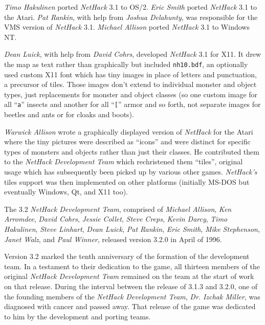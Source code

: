 \documentclass[titlepage]{article}
\begin{document}
\medskip
\noindent \textit{Timo Hakulinen} ported \textit{NetHack} 3.1 to OS/2.
\textit{Eric Smith} ported \textit{NetHack} 3.1 to the Atari.
\textit{Pat Rankin}, with help from \textit{Joshua Delahunty},
was responsible for the VMS version of \textit{NetHack} 3.1.
\textit{Michael Allison} ported \textit{NetHack} 3.1 to Windows NT.

\medskip
\noindent \textit{Dean Luick}, with help from \textit{David Cohrs}, developed
\textit{NetHack} 3.1 for X11.
It drew the map as text rather than graphically but
included \texttt{nh10.bdf}, an optionally used custom X11 font which has
tiny images in place of letters and punctuation, a precursor of tiles.
Those images don't extend to individual monster and object types, just
replacements for monster and object classes (so one custom image for all
``\texttt{a}'' insects and another for all ``\texttt{[}'' armor and so
forth, not separate images for beetles and ants or for cloaks and boots).

\medskip
\noindent \textit{Warwick Allison} wrote a graphically displayed version
of \textit{NetHack}
for the Atari where the tiny pictures were described as ``icons'' and
were distinct for specific types of monsters and objects rather than just
their classes.
He contributed them to the \textit{NetHack Development Team} which
rechristened them ``tiles'', original usage which has subsequently been
picked up by various other games.
\textit{NetHack's} tiles support was then implemented on other platforms
(initially MS-DOS but eventually Windows, Qt, and X11 too).

\medskip
\noindent The 3.2 \textit{NetHack Development Team}, comprised of \textit{Michael Allison}, \textit{Ken
Arromdee}, \textit{David Cohrs}, \textit{Jessie Collet}, \textit{Steve Creps}, {\it
Kevin Darcy}, \textit{Timo Hakulinen}, \textit{Steve Linhart}, \textit{Dean Luick},
\textit{Pat Rankin}, \textit{Eric Smith}, \textit{Mike Stephenson}, \textit{Janet Walz},
and \textit{Paul Winner}, released version 3.2.0 in April of 1996.

\medskip
\noindent Version 3.2 marked the tenth anniversary of the formation of the
development team.
In a testament to their dedication to the game, all thirteen members
of the original \textit{NetHack Development Team} remained on the team at the
start of work on that release.
During the interval between the release of 3.1.3 and 3.2.0,
one of the founding members of the \textit{NetHack Development Team},
\textit{Dr. Izchak Miller}, was diagnosed with cancer and passed away.
That release of the game was
dedicated to him by the development and porting teams.
\end{document}
